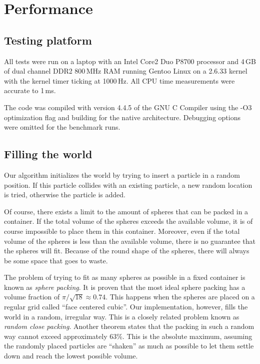 
\section{Performance}
\subsection{Testing platform}

All tests were run on a laptop with an Intel Core2 Duo P8700 processor and 
4\,GB of dual channel DDR2 800\,MHz RAM running Gentoo Linux on a 2.6.33 
kernel with the kernel timer ticking at 1000\,Hz. All CPU time measurements 
were accurate to 1\,ms.

The code was compiled with version 4.4.5 of the GNU C Compiler using the 
-O3 optimization flag and building for the native architecture. Debugging  
options were omitted for the benchmark runs.


\subsection{Filling the world}
Our algorithm initializes the world by trying to insert a particle in a 
random position. If this particle collides with an existing particle, a new 
random location is tried, otherwise the particle is added.

Of course, there exists a limit to the amount of spheres that can be packed in 
a container. If the total volume of the spheres exceeds the available volume, 
it is of course impossible to place them in this container.  Moreover, even if 
the total volume of the spheres is less than the available volume, there is no 
guarantee that the spheres will fit. Because of the round shape of the spheres, 
there will always be some space that goes to waste.


The problem of trying to fit as many spheres as possible in a fixed 
container is known as \emph{sphere packing}. It is 
proven\cite{idealPacking}
that the most ideal sphere packing has a volume fraction of $\pi / \sqrt{18}
\approx 0.74$. This happens when the spheres are placed on a regular grid
called  ``face centered cubic''. Our implementation, however, fills the 
world in a random, irregular way. This is a closely related problem known 
as \emph{random close packing}. Another theorem\cite{randomPacking} states that 
the packing in such a random way cannot exceed approximately 63\%. This is the 
absolute maximum, assuming the randomly placed particles are ``shaken'' as much 
as possible to let them settle down and reach the lowest possible volume.

